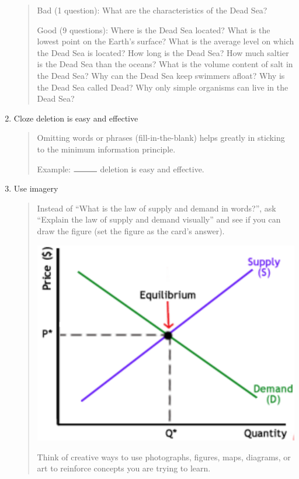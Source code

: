 \documentclass[]{tufte-handout}
\begin{document}
\begin{enumerate}
\begin{quote}
Bad (1 question): What are the characteristics of the Dead Sea?

Good (9 questions): Where is the Dead Sea located? What is the lowest point on the Earth's surface? What is the average level on which the Dead Sea is located? How long is the Dead Sea? How much saltier is the Dead Sea than the oceans? What is the volume content of salt in the Dead Sea? Why can the Dead Sea keep swimmers afloat? Why is the Dead Sea called Dead? Why only simple organisms can live in the Dead Sea?
\end{quote}

\item{Cloze deletion is easy and effective}

\begin{quote}
Omitting words or phrases (fill-in-the-blank) helps greatly in sticking to the minimum information principle.

Example: $\rule{1cm}{0.15mm}$ deletion is easy and effective.
\end{quote}

\item{Use imagery}

\begin{quote}
Instead of ``What is the law of supply and demand in words?'', ask ``Explain the law of supply and demand visually'' and see if you can draw the figure (set the figure as the card's answer).

\begin{marginfigure}%
  \includegraphics[width=0.7\linewidth]{supply-demand.png}
\end{marginfigure}

Think of creative ways to use photographs, figures, maps, diagrams, or art to reinforce concepts you are trying to learn.
\end{quote}


\end{enumerate}
\end{document}
